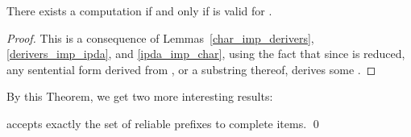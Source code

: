 \begin{isabellebody}
\begin{isamarkuptext}
\begin{theorem}\label{char_eq_reliable_prefix}
There exists a  computation 
if and only if  is valid for \isa{{\isasymgamma}}.
\begin{proof}
This is a consequence of Lemmas~\ref{char_imp_derivers}, \ref{derivers_imp_ipda}, and 
\ref{ipda_imp_char}, using the fact that since  is reduced, any sentential form derived from 
, or a substring thereof, derives some .
\end{proof}
\end{theorem}

By this Theorem, we get two more interesting results:

\begin{corollary}
 accepts exactly the set of reliable prefixes to complete items.
\qed
\end{corollary}


\end{isamarkuptext}
\end{isabellebody}
